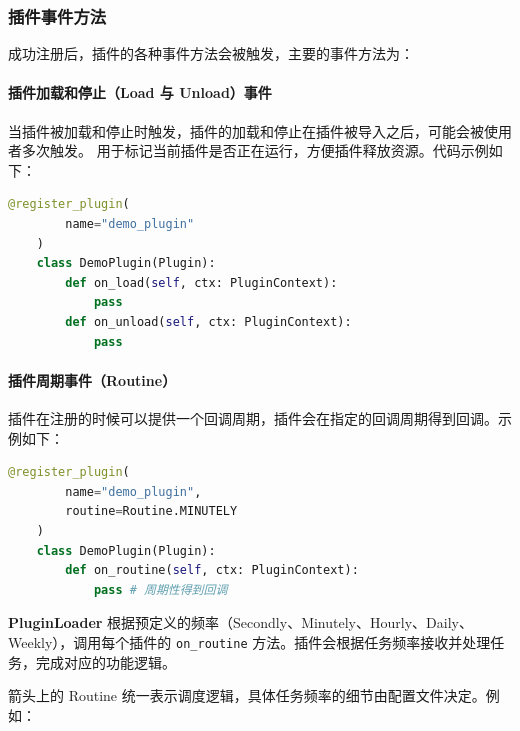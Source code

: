 \documentclass[14pt,a4paper,UTF8,twoside]{article}
\begin{document}
\newpage{} %

\subsubsection{插件事件方法}

成功注册后，插件的各种事件方法会被触发，主要的事件方法为：

\paragraph{插件加载和停止（Load 与 Unload）事件}

当插件被加载和停止时触发，插件的加载和停止在插件被导入之后，可能会被使用者多次触发。
用于标记当前插件是否正在运行，方便插件释放资源。代码示例如下：

\begin{lstlisting}[language=python, title = 插件加载和停止示例]
    @register_plugin(
        name="demo_plugin"
    )
    class DemoPlugin(Plugin):
        def on_load(self, ctx: PluginContext):
            pass
        def on_unload(self, ctx: PluginContext):
            pass
\end{lstlisting}

\paragraph{插件周期事件（Routine）}\label{para:routine}
插件在注册的时候可以提供一个回调周期，插件会在指定的回调周期得到回调。示例如下：

\begin{lstlisting}[language=python, title= 周期事件示例]
    @register_plugin(
        name="demo_plugin",
        routine=Routine.MINUTELY
    )
    class DemoPlugin(Plugin):
        def on_routine(self, ctx: PluginContext):
            pass # 周期性得到回调
\end{lstlisting}

\begin{note}
\noindent \textbf{PluginLoader} 根据预定义的频率（Secondly、Minutely、Hourly、Daily、Weekly），调用每个插件的 \texttt{on\_routine} 方法。插件会根据任务频率接收并处理任务，完成对应的功能逻辑。

\vspace{0.3cm}

\noindent 箭头上的 Routine 统一表示调度逻辑，具体任务频率的细节由配置文件决定。例如：
\end{note}

\vspace{0.27cm}
\end{document}

